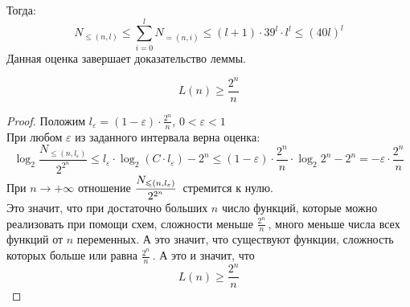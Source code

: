 Тогда:
$$N_{\leq(n,l)} \leq \sum _{i=0} ^{l} N_{=(n,i)} \leq (l+1)\cdot 39^l \cdot l^l \leq (40l)^l$$
Данная оценка завершает доказательство леммы.
\begin{statement}
$$L(n) \geq \frac{2^n}{n}$$
\end{statement}
\begin{proof}
Положим $l_\varepsilon = (1-\varepsilon)\cdot \frac{2^n}{n}$, $0 < \varepsilon < 1$\\
При любом $\varepsilon$ из заданного интервала верна оценка:
$$ \log_2{\frac{N_{\leq(n,l_\varepsilon)}}{2^{2^n}} } \leq l_\varepsilon \cdot \log_2 {(C\cdot l_\varepsilon)} - 2^n \leq (1-\varepsilon)\cdot \frac{2^n}{n} \cdot \log_2 {2^n} - 2^n = -\varepsilon \cdot \frac{2^n}{n}$$
При $n \rightarrow +\infty$ отношение $\cfrac{N_{\leq(n,l_\varepsilon)}}{2^{2^n}} \;$ стремится к нулю.\\

Это значит, что при достаточно больших $n$ число функций, которые можно реализовать при помощи схем, сложности меньше $\frac{2^n}{n}\,$, много меньше числа всех функций от $n$ переменных. А это значит, что существуют функции, сложность которых больше или равна $\frac{2^n}{n}\,$. А это и значит, что 
$$L(n) \geq \frac{2^n}{n}$$
\end{proof}
